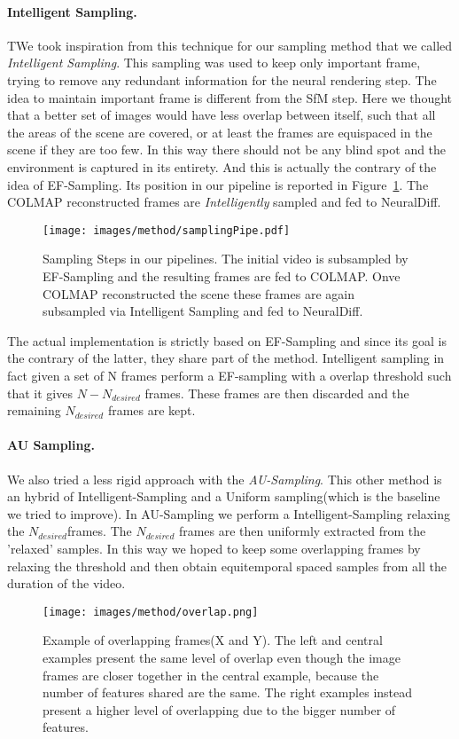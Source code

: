 \paragraph*{Intelligent Sampling.}TWe took inspiration from this technique for our sampling method that we called \textit{Intelligent Sampling}. This sampling was 
used to keep only important frame, trying to remove any redundant information for the neural rendering step. The idea to maintain 
important frame is different from the SfM step. Here we thought that a better set of images would have less overlap between itself,
such that all the areas of the scene are covered, or at least the frames are equispaced in the scene if they are too few. In this way there should not
be any blind spot and the environment is captured in its entirety. And this is actually the contrary of the idea of EF-Sampling.
Its position in our pipeline is reported in Figure~\ref{fig:samplPipe}. The COLMAP reconstructed frames are \textit{Intelligently} sampled and fed to NeuralDiff.
\begin{figure}[t]
    \centering
    \texttt{[image: images/method/samplingPipe.pdf]} 
    \caption{Sampling Steps in our pipelines. The initial video is subsampled by
    EF-Sampling and the resulting frames are fed to COLMAP. Onve COLMAP reconstructed the scene 
    these frames are again subsampled via Intelligent Sampling and fed to NeuralDiff.}\label{fig:samplPipe}
\end{figure}

The actual implementation is strictly based on EF-Sampling and since its goal is the contrary of the latter, they share part of the method.
Intelligent sampling in fact given a set of N frames perform a EF-sampling with a overlap threshold such that it gives $ N-N_{desired}$ frames.
These frames are then discarded and the remaining $N_{desired}$ frames are kept.

\paragraph*{AU Sampling.}We also tried a less rigid approach with the \textit{AU-Sampling}. This other method is an hybrid of Intelligent-Sampling and a Uniform sampling(which
is the baseline we tried to improve). In AU-Sampling we perform a Intelligent-Sampling relaxing the $N_{desired}$frames. The $N_{desired}$ frames are then 
uniformly extracted from the 'relaxed' samples. In this way we hoped to keep some overlapping frames by relaxing the threshold and then obtain
equitemporal spaced samples from all the duration of the video. 

\begin{figure}[t]
    \centering
    \texttt{[image: images/method/overlap.png]} 
    \caption{Example of overlapping frames(X and Y). The left and central
    examples present the same level of overlap even though the image frames 
    are closer together in the central example, because the 
    number of features shared are the same. The right examples instead
    present a higher level of overlapping due to the bigger number of 
    features.}\label{fig:overlap}
\end{figure}
